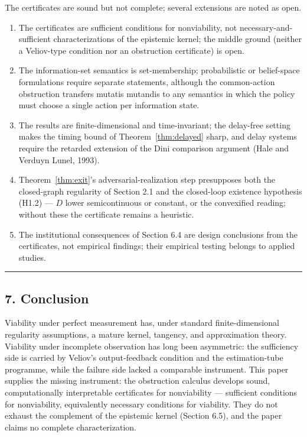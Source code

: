 \documentclass[11pt]{article}
\theoremstyle{definition}
\providecommand{\tightlist}{\setlength{\itemsep}{0pt}\setlength{\parskip}{0pt}}
\begin{document}
The certificates are sound but not complete; several extensions are noted as open.

\begin{enumerate}
\def\labelenumi{(\roman{enumi})}
\tightlist
\item
  The certificates are sufficient conditions for nonviability, not necessary-and-sufficient characterizations of the epistemic kernel; the middle ground (neither a Veliov-type condition nor an obstruction certificate) is open.
\item
  The information-set semantics is set-membership; probabilistic or belief-space formulations require separate statements, although the common-action obstruction transfers mutatis mutandis to any semantics in which the policy must choose a single action per information state.
\item
  The results are finite-dimensional and time-invariant; the delay-free setting makes the timing bound of Theorem~\ref{thm:delayed} sharp, and delay systems require the retarded extension of the Dini comparison argument (Hale and Verduyn Lunel, 1993).
\item
  Theorem~\ref{thm:exit}'s adversarial-realization step presupposes both the closed-graph regularity of Section 2.1 and the closed-loop existence hypothesis (H1.2) --- \(D\) lower semicontinuous or constant, or the convexified reading; without these the certificate remains a heuristic.
\item
  The institutional consequences of Section 6.4 are design conclusions from the certificates, not empirical findings; their empirical testing belongs to applied studies.
\end{enumerate}

\begin{center}\rule{0.5\linewidth}{0.5pt}\end{center}

\subsection{7. Conclusion}\label{conclusion}

Viability under perfect measurement has, under standard
finite-dimensional regularity assumptions, a mature kernel, tangency,
and approximation theory. Viability under incomplete observation has
long been asymmetric: the sufficiency side is carried by Veliov's
output-feedback condition and the estimation-tube programme, while the
failure side lacked a comparable instrument. This paper supplies the missing instrument: the obstruction calculus develops sound, computationally interpretable certificates for nonviability --- sufficient conditions for nonviability, equivalently necessary conditions for viability. They do not exhaust the complement of the epistemic kernel (Section 6.5), and the paper claims no complete characterization.
\end{document}
